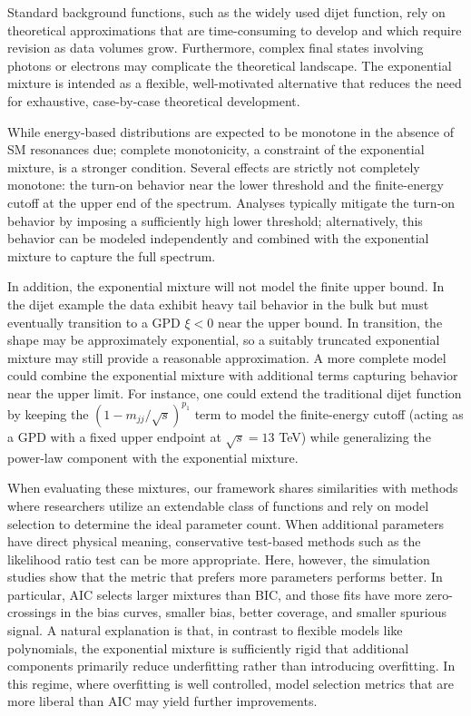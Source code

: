 \documentclass[a4paper,11pt]{article}
\begin{document}
Standard background functions, such as the widely used dijet function, rely on theoretical approximations that are time-consuming to develop and which require revision as data volumes grow. Furthermore, complex final states involving photons or electrons may complicate the theoretical landscape. The exponential mixture is intended as a flexible, well-motivated alternative that reduces the need for exhaustive, case-by-case theoretical development.

While energy-based distributions are expected to be monotone in the absence of SM resonances due; complete monotonicity, a constraint of the exponential mixture, is a stronger condition.
Several effects are strictly not completely monotone: the turn-on behavior near the lower 
threshold and the finite-energy cutoff at the upper end of the spectrum.
Analyses typically mitigate the turn-on behavior by imposing a sufficiently high lower 
threshold; alternatively, this behavior can be modeled independently and combined with the 
exponential mixture to capture the full spectrum. 

In addition, the exponential mixture will not model the finite upper bound. In the dijet example the data exhibit heavy tail behavior in the bulk but must eventually transition to a GPD $\xi<0$ near the upper bound. In transition, the shape may be approximately exponential, so a suitably truncated exponential 
mixture may still provide a reasonable approximation.
A more complete model could combine the exponential mixture with additional terms capturing 
behavior near the upper limit. For instance, one could extend the traditional dijet function by keeping the $(1-m_{jj}/\sqrt{s})^{p_1}$ term to model the finite-energy cutoff (acting as a GPD with a fixed upper endpoint at $\sqrt{s}=13$ TeV) while generalizing the power-law component with the exponential mixture.

When evaluating these mixtures, our framework shares similarities with methods where researchers utilize an extendable class of functions and rely on model selection to determine the ideal parameter count. When additional parameters have direct physical meaning, conservative test-based methods such as the likelihood ratio test can be more appropriate. Here, however, the simulation studies show that the metric that prefers more parameters performs better. In particular, AIC selects larger mixtures than BIC, and those fits have more zero-crossings in the bias curves, smaller bias, better coverage, and smaller spurious signal. A natural explanation is that, in contrast to flexible models like polynomials, the exponential mixture is sufficiently rigid that additional components primarily reduce underfitting rather than introducing overfitting. In this regime, where overfitting is well controlled, model selection metrics that are more liberal than AIC may yield further improvements.
\end{document}
